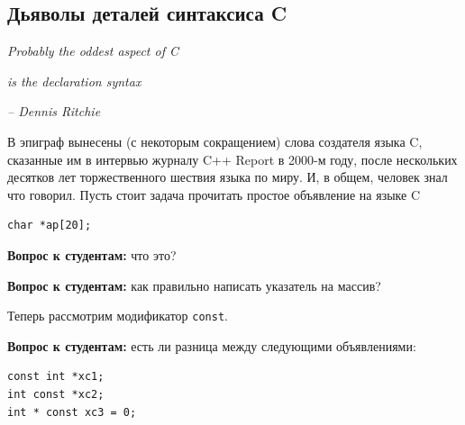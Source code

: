 \documentclass[a4paper,12pt,oneside]{book}
\newif\ifanswers
\begin{document}
\subsection{Дьяволы деталей синтаксиса C}\label{DevilDetails}

\hfill\textit{Probably the oddest aspect of C}

\hfill\textit{is the declaration syntax}{\vspace{0.5em}}

\hfill\textit{-- Dennis Ritchie}

В эпиграф вынесены (с некоторым сокращением) слова создателя языка C, сказанные им в интервью журналу C++ Report в 2000-м году, после нескольких десятков лет торжественного шествия языка по миру. И, в общем, человек знал что говорил. Пусть стоит задача прочитать простое объявление на языке C

% 
\begin{lstlisting}
char *ap[20];
\end{lstlisting}

\textbf{Вопрос к студентам:} что это? 

\ifanswers
Ответ: да, это массив указателей\index{Array of pointers}. 
\fi

\textbf{Вопрос к студентам:} как правильно написать указатель на массив?

\ifanswers
Ответ\index{Pointer to array}:

\begin{lstlisting}
char (*pa)[20];
\end{lstlisting}
\fi

Теперь рассмотрим модификатор \lstinline!const!. 

\textbf{Вопрос к студентам:} есть ли разница между следующими объявлениями:

\begin{lstlisting}
const int *xc1;
int const *xc2;
int * const xc3 = 0;
\end{lstlisting}

\ifanswers
Ответ: между первым и вторым нет, между вторым и третьим очень существенная разница. Во втором случае (как и в первом) речь идёт о \textbf{не константном} указателе на константные данные. В третьем случае речь идёт о \textbf{константном} указателе на не константные данные. Объявляя константу нельзя оставить её неинициализированной, поэтому инициализатор выделяет строчку, где объявлен константный указатель. В то же время, указатель на константные данные сам может быть неконстантным и инициализации не требует (хотя она возможна).
\fi
\end{document}
